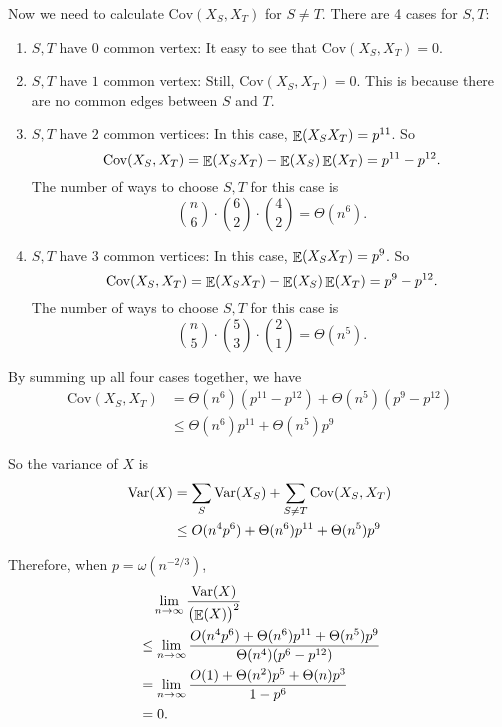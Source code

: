 \documentclass{homework}
\begin{document}
\begin{solution}
  Now we need to calculate $\text{Cov}(X_S, X_T)$ for $S \neq T$.
  There are 4 cases for $S, T$:
  
  \begin{enumerate}
    \item $S, T$ have $0$ common vertex: It easy to see that $\text{Cov}(X_S, X_T) = 0$.
    \item $S, T$ have $1$ common vertex: Still, $\text{Cov}(X_S, X_T) = 0$.
          This is because there are no common edges between $S$ and $T$.
    \item $S, T$ have $2$ common vertices: In this case, $\mathop{\mathbb{E}}\displaylimits(X_SX_T) = p^{11}$.
          So
          \begin{equation*}
            \text{Cov}(X_S, X_T) = \mathop{\mathbb{E}}\displaylimits(X_SX_T) - \mathop{\mathbb{E}}\displaylimits(X_S)\mathop{\mathbb{E}}\displaylimits(X_T) = p^{11} - p^{12}.
          \end{equation*}
          The number of ways to choose $S, T$ for this case is
          \begin{equation*}
            \binom{n}{6} \cdot \binom{6}{2} \cdot \binom{4}{2} = \Theta(n^6).
          \end{equation*}
    \item $S, T$ have $3$ common vertices: In this case, $\mathop{\mathbb{E}}\displaylimits(X_SX_T) = p^{9}$.
          So
          \begin{equation*}
            \text{Cov}(X_S, X_T) = \mathop{\mathbb{E}}\displaylimits(X_SX_T) - \mathop{\mathbb{E}}\displaylimits(X_S)\mathop{\mathbb{E}}\displaylimits(X_T) = p^{9} - p^{12}.
          \end{equation*}
          The number of ways to choose $S, T$ for this case is
          \begin{equation*}
            \binom{n}{5} \cdot \binom{5}{3} \cdot \binom{2}{1} = \Theta(n^5).
          \end{equation*}
  \end{enumerate}

  By summing up all four cases together, we have
  \begin{align*}
    \text{Cov}(X_S, X_T) & = \Theta(n^6)(p^{11} - p^{12}) + \Theta(n^5)(p^{9} - p^{12}) \\
    & \le \Theta(n^6)p^{11} + \Theta(n^5)p^{9}
  \end{align*}

  So the variance of $X$ is
  \begin{align*}
    \mathop{\mathrm{Var}}\displaylimits(X) & = \sum_{S}\mathop{\mathrm{Var}}\displaylimits(X_S) + \sum_{S \neq T}\text{Cov}(X_S, X_T) \\
    & \le O(n^4p^6) + \Theta(n^6)p^{11} + \Theta(n^5)p^{9}
  \end{align*}

  Therefore, when $p = \omega(n^{-2/3})$,
  \begin{align*}
    & \quad \lim_{n \to \infty} \frac{\mathop{\mathrm{Var}}\displaylimits(X)}{{\bigl(\mathop{\mathbb{E}}\displaylimits(X)\bigr)}^{2}} \\
    & \le \lim_{n \to \infty}\frac{O(n^4p^6) + \Theta(n^6)p^{11} + \Theta(n^5)p^{9}}
    {\Theta(n^4)(p^6 - p^{12})} \\
    & = \lim_{n \to \infty}\frac{O(1) + \Theta(n^2)p^5 + \Theta(n)p^3}{1 - p^6} \\
    & = 0.
  \end{align*}


\end{solution}
\end{document}
